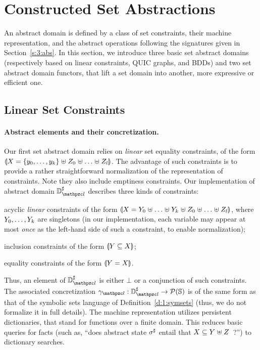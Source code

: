 \section{Constructed Set Abstractions}
\label{sec:constructed} \label{s:4:domains}
An abstract domain is defined by a class of set constraints, their machine
representation, and the abstract operations following the signatures given in
Section~\ref{s:3:abs}.
In this section, we introduce three basic set abstract domains (respectively
based on linear constraints, QUIC graphs, and BDDs) and two set abstract
domain functors, that lift a set domain into another, more expressive or
efficient one.

\subsection{Linear Set Constraints}
\label{s:4:1:lin}
\newcommand{\adomlin}{\adom_{\zcl}}
\newcommand{\gammalin}{\gamma_{\zcl}}
\paragraph{Abstract elements and their concretization.}
Our first set abstract domain relies on {\em linear} set equality
constraints, of the form \( \llparenthesis X = \{ y_0, \ldots, y_k \} \mathrel{\uplus}
  Z_0 \mathrel{\uplus} \ldots \mathrel{\uplus} Z_l \rrparenthesis \).
The advantage of such constraints is to provide a rather straightforward
normalization of the representation of constraints.
Note they also include emptiness constraints.
Our implementation of abstract domain \( \adomlin \) describes three kinds
of constraints:
\begin{compactitem}
\item acyclic {\em linear} constraints of the form \( \llparenthesis X =
    Y_0 \mathrel{\uplus} \ldots \mathrel{\uplus} Y_k \mathrel{\uplus} Z_0 \mathrel{\uplus} \ldots
    \mathrel{\uplus} Z_l \rrparenthesis \), where \( Y_0, \ldots, Y_k \) are
  singletons (in our implementation, each variable may appear at most
  {\em once} as the left-hand side of such a constraint, to enable
  normalization);
\item inclusion constraints of the form \( \llparenthesis Y \subseteq X \rrparenthesis \);
\item equality constraints of the form \( \llparenthesis Y = X \rrparenthesis \).
\end{compactitem}
Thus, an element of \( \adomlin \) is either \( \bot \) or a conjunction of
such constraints.
The associated concretization \( \gammalin: \adomlin \rightarrow
\partsof{\states} \) is of the same form as that of the symbolic sets
language of Definition~\ref{d:1:symsets} (thus, we do not formalize it
in full details).
The machine representation utilizes persistent dictionaries, that stand
for functions over a finite domain.
This reduces basic queries for facts (such as, ``does abstract state
\( {\sigma}^{\sharp} \) entail that \( X \subseteq Y \mathrel{\uplus} Z
\)~?'') to dictionary searches.

